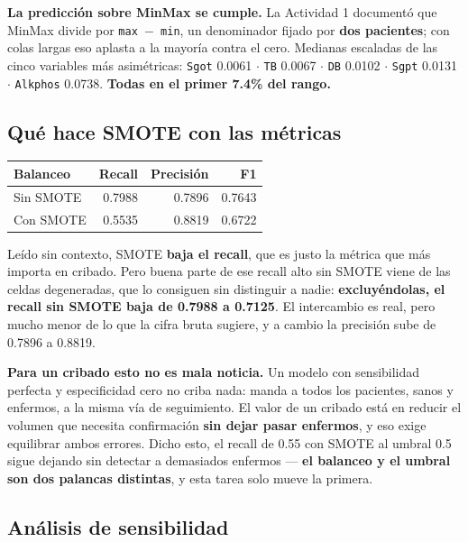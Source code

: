 \documentclass[10pt,a4paper]{article}
\begin{document}
\textbf{La predicción sobre MinMax se cumple.} La Actividad 1 documentó que MinMax divide por \texttt{max $-$ min}, un denominador fijado por \textbf{dos pacientes}; con colas largas eso aplasta a la mayoría contra el cero. Medianas escaladas de las cinco variables más asimétricas: \texttt{Sgot} 0.0061 $\cdot$ \texttt{TB} 0.0067 $\cdot$ \texttt{DB} 0.0102 $\cdot$ \texttt{Sgpt} 0.0131 $\cdot$ \texttt{Alkphos} 0.0738. \textbf{Todas en el primer 7.4\% del rango.}

\subsection{Qué hace SMOTE con las métricas}

\begin{table}[H]
\footnotesize
\centering
\begin{tabular}{@{}l r r r@{}}
\toprule
\textbf{Balanceo} & \textbf{Recall} & \textbf{Precisión} & \textbf{F1} \\
\midrule
Sin SMOTE & 0.7988 & 0.7896 & 0.7643 \\
Con SMOTE & 0.5535 & 0.8819 & 0.6722 \\
\bottomrule
\end{tabular}
\end{table}

Leído sin contexto, SMOTE \textbf{baja el recall}, que es justo la métrica que más importa en cribado. Pero buena parte de ese recall alto sin SMOTE viene de las celdas degeneradas, que lo consiguen sin distinguir a nadie: \textbf{excluyéndolas, el recall sin SMOTE baja de 0.7988 a 0.7125}. El intercambio es real, pero mucho menor de lo que la cifra bruta sugiere, y a cambio la precisión sube de 0.7896 a 0.8819.

\textbf{Para un cribado esto no es mala noticia.} Un modelo con sensibilidad perfecta y especificidad cero no criba nada: manda a todos los pacientes, sanos y enfermos, a la misma vía de seguimiento. El valor de un cribado está en reducir el volumen que necesita confirmación \textbf{sin dejar pasar enfermos}, y eso exige equilibrar ambos errores. Dicho esto, el recall de 0.55 con SMOTE al umbral 0.5 sigue dejando sin detectar a demasiados enfermos --- \textbf{el balanceo y el umbral son dos palancas distintas}, y esta tarea solo mueve la primera.

\subsection{Análisis de sensibilidad}
\end{document}
